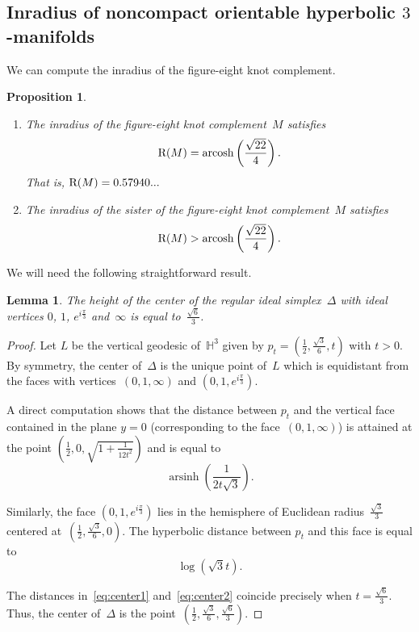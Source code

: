 \documentclass[11pt,reqno]{amsart}
\newtheorem{lemma}[theorem]{Lemma}
\newtheorem{proposition}[theorem]{Proposition}
\theoremstyle{definition}
\numberwithin{equation}{section}
\newcommand{\HH}{{\mathbb H}}
\newcommand\RR{{\rm R}}
\DeclareMathOperator{\arsinh}{arsinh}
\DeclareMathOperator{\arcosh}{arcosh}
\numberwithin{equation}{section}
\begin{document}
\subsection{Inradius of noncompact orientable hyperbolic \texorpdfstring{$3$}{3}-manifolds}

We can compute the inradius of the figure-eight knot complement.

\begin{proposition} \label{prop:inradius_orientable}
\mbox{ }
\begin{enumerate}
\item The inradius of the figure-eight knot complement~$M$ satisfies
\[
\RR(M) = \arcosh \left( \frac{\sqrt{22}}{4} \right).
\]
That is, $\RR(M) = 0.57940...$
\item The inradius of the sister of the figure-eight knot complement~$M$ satisfies
\[
\RR(M) > \arcosh \left( \frac{\sqrt{22}}{4} \right).
\]
\end{enumerate}
\end{proposition}

We will need the following straightforward result.

\begin{lemma}
The height of the center of the regular ideal simplex~$\Delta$ with ideal vertices $0$, $1$, $e^{i \frac{\pi}{3}}$ and~$\infty$ is equal to~$\frac{\sqrt{6}}{3}$.
\end{lemma}

\begin{proof}
Let $L$ be the vertical geodesic of~$\HH^3$ given by $p_t=(\frac{1}{2}, \frac{\sqrt{3}}{6},t)$ with $t >0$.
By symmetry, the center of~$\Delta$ is the unique point of~$L$ which is equidistant from the faces with vertices~$(0,1,\infty)$ and $(0,1,e^{i\frac{\pi}{3}})$.

A direct computation shows that the distance between $p_t$ and the vertical face contained in the plane $y=0$ (corresponding to the face~$(0,1,\infty)$) is attained at the point $(\frac{1}{2},0,\sqrt{1+\frac{1}{12t^2}})$ and is equal to 
\begin{equation} \label{eq:center1}
\arsinh \left( \frac{1}{2 t \sqrt{3}} \right).
\end{equation}

Similarly, the face $(0,1,e^{i\frac{\pi}{3}})$ lies in the hemisphere of Euclidean radius~$\frac{\sqrt{3}}{3}$ centered at~$(\frac{1}{2}, \frac{\sqrt{3}}{6},0)$.
The hyperbolic distance between $p_t$ and this face is equal to
\begin{equation} \label{eq:center2}
\log \left( \sqrt{3} t \right).
\end{equation}

The distances in~\eqref{eq:center1} and~\eqref{eq:center2} coincide precisely when $t=\frac{\sqrt{6}}{3}$.
Thus, the center of~$\Delta$ is the point~$(\frac{1}{2}, \frac{\sqrt{3}}{6},\frac{\sqrt{6}}{3})$.
\end{proof}
\end{document}
